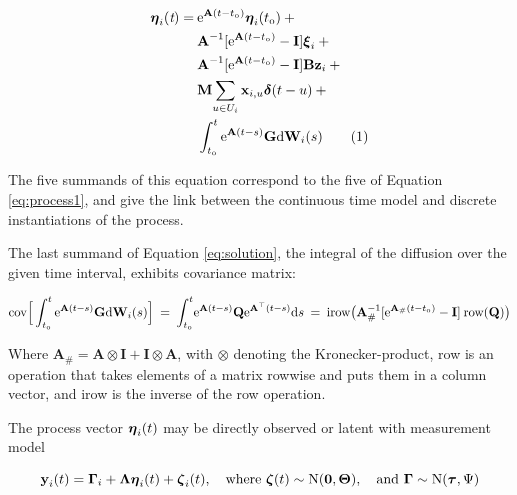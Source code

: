 \documentclass[nojss]{jss}\usepackage[]{graphicx}\usepackage[]{color}
\newcommand\numberthis{\addtocounter{equation}{1}\tag{\theequation}} %
\begin{document}
\begin{align*}
\boldsymbol{\eta}_\mathnormal{i}(\textit{t}) = \: &
\mathrm{e}^{ \textbf{A} (\mathnormal{t-t_0})  }  \boldsymbol{\eta}_\mathnormal{i}(\mathnormal{t_0}) \: + \\
&\textbf{A}^{-1} [\mathrm{e}^{\textbf{A} \mathnormal{(t-t_0)} } - \textbf{I}] \boldsymbol{\xi}_\mathnormal{i} \: + \\
&\textbf{A}^{-1} [\mathrm{e}^{\textbf{A} \mathnormal{(t-t_0)} } - \textbf{I}]\textbf{Bz}_\mathnormal{i} \: + \\
&\mathbf{M} \mathrm{ \sum_{\mathnormal{u} \in \mathnormal{U_i}}  \mathbf{x}_{\mathnormal{i,u}} \boldsymbol{\delta} ( \mathnormal{t-u} )} \: + \\
&\int_{\mathnormal{t_0}}^\mathnormal{t} \mathrm{e}^{\textbf{A} \mathnormal{(t-s)} } \textbf{G}\textrm{d}\textbf{W}_\mathnormal{i}\mathnormal{(s)} \numberthis 
\label{eq:solution}
\end{align*}

The five summands of this equation correspond to the five of Equation \ref{eq:process1}, and give the
link between the continuous time model and discrete instantiations of the process. 

The last summand of Equation \ref{eq:solution}, the integral of the diffusion over the given time interval, exhibits covariance matrix:

\begin{equation}
\label{eq:dyncov}
\mathrm{cov \Big[ \int_{\mathnormal{t_0}}^\mathnormal{t} \mathrm{e}^{\textbf{A}(\mathnormal{t-s})} \textbf{G}d\textbf{W}_\mathnormal{i}(\mathnormal{s})\Big] \: 
= \: \mathnormal{\int_{t_0}^t } \mathrm{e}^{\textbf{A} \mathnormal{(t-s)} }\textbf{Q} \mathrm{e}^{\textbf{A}^\top \mathnormal{(t-s)}} d\mathnormal{s} \: 
= \: irow \big( \textbf{A}_{\#}^{-1} [\mathrm{e}^{\textbf{A}_{\#} \mathnormal{(t-t_0)} } - \textbf{I}] \: row (\textbf{Q}) \big) }
\end{equation}

Where $\textbf{A}_{\#} = \textbf{A} \otimes \textbf{I} + \textbf{I} \otimes \textbf{A} $, with $\otimes$ denoting the Kronecker-product, row is an operation that takes elements of a matrix rowwise and puts them in a column vector, and irow is the inverse of the row operation.

The process vector $\boldsymbol{\eta}_\mathnormal{i}(\mathnormal{t})$ may be directly observed or latent with measurement model

\begin{equation}
\label{eq:measurement}
\mathrm{\textbf{y}_\mathnormal{i} \mathnormal{(t)} = \boldsymbol{\Gamma}_\mathnormal{i} + \boldsymbol{\Lambda} \boldsymbol{\eta}_\mathnormal{i} ( \mathnormal{t} ) + \boldsymbol{\zeta}_\mathnormal{i}\mathnormal{(t)},  
\quad \text{where } \boldsymbol{\zeta}\mathnormal{(t)} \sim  \mathrm{N} ( \textbf{0} , \boldsymbol{\Theta} ) ,
\quad \text{and } \boldsymbol{\Gamma} \sim  \mathrm{N} ( \boldsymbol{\tau} , \Psi ) }
\end{equation}
\end{document}
